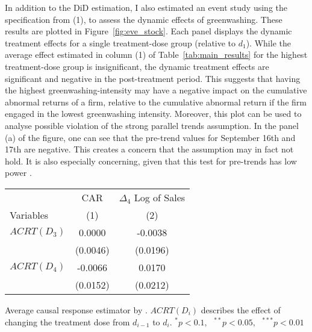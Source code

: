 \documentclass[12pt]{article}
\begin{document}
In addition to the DiD estimation, I also estimated an event study using the specification from (1), to assess the dynamic effects of greenwashing. These results are plotted in Figure~\ref{fig:eve_stock}. Each panel displays the dynamic treatment effects for a single treatment-dose group (relative to $d_1$). While the average effect estimated in column (1) of Table~\ref{tab:main_results} for the highest treatment-dose group is insignificant, the dynamic treatment effects are significant and negative in the post-treatment period. This suggests that having the highest greenwashing-intensity may have a negative impact on the cumulative abnormal returns of a firm, relative to the cumulative abnormal return if the firm engaged in the lowest greenwashing intensity. Moreover, this plot can be used to analyse possible violation of the strong parallel trends assumption. In the panel (a) of the figure, one can see that the pre-trend values for September 16th and 17th are negative. This creates a concern that the assumption may in fact not hold. It is also especially concerning, given that this test for pre-trends has low power \parencite{rothWhatsTrendingDifferenceindifferences2023}.
                            
\begin{table}[h] \centering
    \label{tab:acrt}
    
    \begin{tabular}{lcc}
        \toprule
        \toprule
                            & CAR           & $\Delta_4$ Log of Sales \\
        Variables           & (1)           & (2)\\
        \midrule
        $ACRT(D_3)$         & 0.0000        & -0.0038 \\
                            & (0.0046)      & (0.0196)\\
        $ACRT(D_4)$         & -0.0066       & 0.0170\\
                            & (0.0152)      & (0.0212)\\
        \bottomrule
    \end{tabular}
    
    \begin{tablenotes}
        \footnotesize
        \item Average causal response estimator by \textcite{callawayDifferenceinDifferencesContinuousTreatment2025}. $ACRT(D_i)$ describes the effect of changing the treatment dose from $d_{i-1}$ to $d_i$. $^{*}p<0.1, \text{ } ^{**}p<0.05,\text{ } ^{***}p<0.01$
    \end{tablenotes}
    
\end{table}
\end{document}
